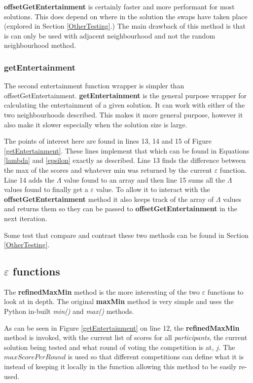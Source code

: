 \documentclass[12pt]{report}
\begin{document}
\textbf{offsetGetEntertainment} is certainly faster and more performant for most solutions. This does depend on where in the solution the swaps have taken place (explored in Section \ref{OtherTesting}.) The main drawback of this method is that is can only be used with adjacent neighbourhood and not the random neighbourhood method.

\subsubsection{getEntertainment}
The second entertainment function wrapper is simpler than {offsetGetEntertainment}. \textbf{getEntertainment} is the general purpose wrapper for calculating the entertainment of a given solution. It can work with either of the two neighbourhoods described. This makes it more general purpose, however it also make it slower especially when the solution size is large.

The points of interest here are found in lines 13, 14 and 15 of Figure \ref{getEntertainment}. These lines implement that which can be found in Equations \ref{lambda} and \ref{epsilon} exactly as described. Line 13 finds the difference between the max of the scores and whatever min was returned by the current $\varepsilon$ function. Line 14 adds the $\Lambda$ value found to an array and then line 15 sums all the $\Lambda$ values found to finally get a $\varepsilon$ value. To allow it to interact with the \textbf{offsetGetEntertainment} method it also keeps track of the array of $\Lambda$ values and returns them so they can be passed to \textbf{offsetGetEntertainment} in the next iteration.

Some test that compare and contrast these two methods can be found in Section \ref{OtherTesting}.

\subsection{$\varepsilon$ functions}\label{Imp-eFunctions}
The \textbf{refinedMaxMin} method is the more interesting of the two $\varepsilon$ functions to look at in depth. The original \textbf{maxMin} method is very simple and uses the Python in-built \textit{min()} \cite{PythonMin} and \textit{max()} \cite{PythonMax} methods.

As can be seen in Figure \ref{getEntertainment} on line 12, the \textbf{refinedMaxMin} method is invoked, with the current list of scores for all \textit{participants}, the current solution being tested and what round of voting the competition is at, $j$. The $maxScorePerRound$ is used so that different competitions can define what it is instead of keeping it locally in the function allowing this method to be easily re-used.
\end{document}
